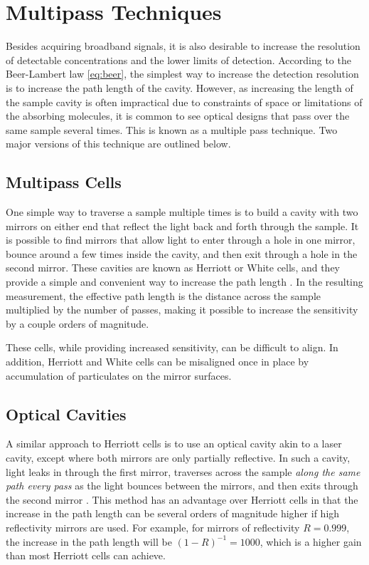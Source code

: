 \section{Multipass Techniques}\label{sec:multipass}

Besides acquiring broadband signals, it is also desirable to increase the
resolution of detectable concentrations and the lower limits of detection.
According to the Beer-Lambert law \eqref{eq:beer}, the simplest way to increase
the detection resolution is to increase the path length of the cavity. However,
as increasing the length of the sample cavity is often impractical due to
constraints of space or limitations of the absorbing molecules, it is common to
see optical designs that pass over the same sample several times. This is known
as a multiple pass technique. Two major versions of this technique are outlined
below.



\subsection{Multipass Cells}\label{subsec:herriott}

One simple way to traverse a sample multiple times is to build a cavity with
two mirrors on either end that reflect the light back and forth through the
sample. It is possible to find mirrors that allow light to enter through a
hole in one mirror, bounce around a few times inside the cavity, and then exit
through a hole in the second mirror. These cavities are known as Herriott or
White cells, and they provide a simple and convenient way to increase the
path length \cite{Engel:2007va}. In the resulting measurement, the effective
path length is the distance across the sample multiplied by the number of
passes, making it possible to increase the sensitivity by a couple orders of
magnitude.

These cells, while providing increased sensitivity, can be difficult to align.
In addition, Herriott and White cells can be misaligned once in place by
accumulation of particulates on the mirror surfaces.



\subsection{Optical Cavities}\label{subsec:cavity}

A similar approach to  Herriott cells is to use an optical cavity akin to a
laser cavity, except where both mirrors are only partially reflective. In such
a cavity, light leaks in through the first mirror, traverses across the sample
\emph{along the same path every pass} as the light bounces between the mirrors,
and then exits through the second mirror \cite{Berden:2009wk}. This method has an advantage over
Herriott cells in that the increase in the path length can be several orders of
magnitude higher if high reflectivity mirrors are used. For example, for
mirrors of reflectivity $R=0.999$, the increase in the path length will be
$(1-R)^{-1} = 1000$, which is a higher gain than most Herriott cells can
achieve.

